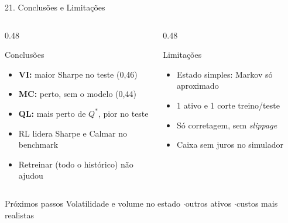 \documentclass[aspectratio=169,10pt,t]{beamer}
\newenvironment{altura}[2][c]{\begin{minipage}[t][#2][#1]{\linewidth}}{\end{minipage}}
\begin{document}
\begin{frame}{21. Conclusões e Limitações}

  \begin{columns}[T,onlytextwidth]
    \begin{column}{0.48\textwidth}
      \begin{block}{Conclusões}
        \begin{altura}{3.0cm}
        \small
        \begin{itemize}\setlength{\itemsep}{4pt}
          \item \textbf{VI:} maior Sharpe no teste (0,46)
          \item \textbf{MC:} perto, sem o modelo (0,44)
          \item \textbf{QL:} mais perto de $Q^*$, pior no teste
          \item RL lidera Sharpe e Calmar no benchmark
          \item Retreinar (todo o histórico) não ajudou
        \end{itemize}
        \end{altura}
      \end{block}
    \end{column}

    \begin{column}{0.48\textwidth}
      \begin{alertblock}{Limitações}
        \begin{altura}{3.0cm}
        \small
        \begin{itemize}\setlength{\itemsep}{4pt}
          \item Estado simples: Markov só aproximado
          \item 1 ativo e 1 corte treino/teste
          \item Só corretagem, sem \textit{slippage}
          \item Caixa sem juros no simulador
        \end{itemize}
        \end{altura}
      \end{alertblock}
    \end{column}
  \end{columns}

  \vskip 0.2cm

  \begin{block}{Próximos passos}
    \small
    Volatilidade e volume no estado \quad$\cdot$\quad outros ativos \quad$\cdot$\quad custos mais realistas
  \end{block}

\end{frame}
\end{document}
